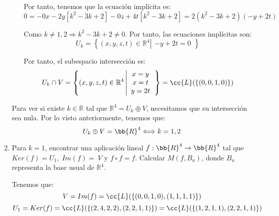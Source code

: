 \documentclass[12pt]{article}
\begin{document}
\begin{ejercicio}
\begin{enumerate}
\begin{itemize}
            Por tanto, tenemos que la ecuación implícita es:
            \begin{equation*}
                0 = -0x -2y[k^2 -3k +2] -0z +4t[k^2 -3k +2] = 2(k^2 -3k +2)(-y+2t)
            \end{equation*}

            Como $k\neq 1,2\Longrightarrow k^2 -3k +2\neq 0$. Por tanto, las ecuaciones implícitas son:
            \begin{equation*}
                U_k = \left\{(x,y,z,t)\in \mathbb{R}^4 \left|\begin{array}{c}
                    -y+2t=0
                \end{array}\right.\right\}
            \end{equation*}

            Por tanto, el subespacio intersección es:
            \begin{equation*}
                U_k\cap V = \left\{(x,y,z,t)\in \mathbb{R}^4 \left|\begin{array}{c}
                    x=y\\ x=t \\ y=2t
                \end{array}\right.\right\}
                = \cc{L}(\{(0,0,1,0)\})
            \end{equation*}
        \end{itemize}
        

        Para ver si existe $k\in \mathbb{R}$ tal que $\mathbb{R}^4= U_k \oplus V$, necesitamos que su intersección sea nula. Por lo visto anteriormente, tenemos que:
        \begin{equation*}
            U_k\oplus V = \bb{R}^4 \Longleftrightarrow k=1,2
        \end{equation*}

        \item Para $k=1$, encontrar una aplicación lineal $f:\bb{R}^4\to \bb{R}^4$ tal que $Ker(f) = U_1,\;Im(f)=~V$ y $f \circ f = f$. Calcular $M(f, B_u)$, donde $B_u$ representa la base usual de $\mathbb{R}^4$.

        Tenemos que:
        \begin{equation*}
            V=Im(f)=\cc{L}(\{(0,0,1,0), (1,1,1,1)\})
        \end{equation*}
        \begin{equation*}
            U_1=Ker(f)=\cc{L}(\{(2,4,2,2), (2,2,1,1)\}) = \cc{L}(\{(1,2,1,1), (2,2,1,1)\})
        \end{equation*}


\end{enumerate}
\end{ejercicio}
\end{document}
